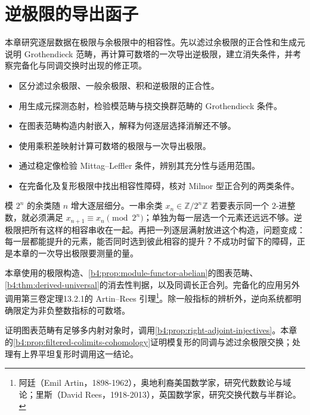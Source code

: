 
\chapter{逆极限的导出函子}
\label{b4:ch:13}

\begin{chapterabstract}
	本章研究逐层数据在极限与余极限中的相容性。先以滤过余极限的正合性和生成元说明 Grothendieck 范畴，再计算可数塔的一次导出逆极限，建立消失条件，并考察完备化与同调交换时出现的修正项。
\end{chapterabstract}

\begin{learninggoals}
	\begin{itemize}
		\item 区分滤过余极限、一般余极限、积和逆极限的正合性。
		\item 用生成元探测态射，检验模范畴与挠交换群范畴的 Grothendieck 条件。
		\item 在图表范畴构造内射嵌入，解释为何逐层选择消解还不够。
		\item 使用乘积差映射计算可数塔的极限与一次导出极限。
		\item 通过稳定像检验 Mittag–Leffler 条件，辨别其充分性与适用范围。
		\item 在完备化及复形极限中找出相容性障碍，核对 Milnor 型正合列的两类条件。
	\end{itemize}
\end{learninggoals}

模 \(2^n\) 的余类随 \(n\) 增大逐层细分。一串余类 \(x_n\in\mathbb Z/2^n\mathbb Z\) 若要表示同一个 \(2\)-进整数，就必须满足 \(x_{n+1}\equiv x_n\pmod{2^n}\)；单独为每一层选一个元素还远远不够。逆极限把所有这样的相容串收在一起。再把一列逐层满射放进这个构造，问题变成：每一层都能提升的元素，能否同时选到彼此相容的提升？不成功时留下的障碍，正是本章的一次导出极限要测量的量。

\ProseParagraphBreak
本章使用的极限构造、\cref{b4:prop:module-functor-abelian}的图表范畴、\cref{b4:thm:derived-universal}的消去性判据，以及同调长正合列。完备化的应用另外调用第三卷定理13.2.1的 Artin–Rees 引理\footnote{阿廷（Emil Artin，1898-1962），奥地利裔美国数学家，研究代数数论与域论；里斯（David Rees，1918-2013），英国数学家，研究交换代数与半群论。}。除一般指标的辨析外，逆向系统都明确限定为非负整数指标的可数塔。

\ProseParagraphBreak
{}证明图表范畴有足够多内射对象时，调用\cref{b4:prop:right-adjoint-injectives}。本章的\cref{b4:prop:filtered-colimits-cohomology}证明模复形的同调与滤过余极限交换；处理有上界平坦复形时调用这一结论。

